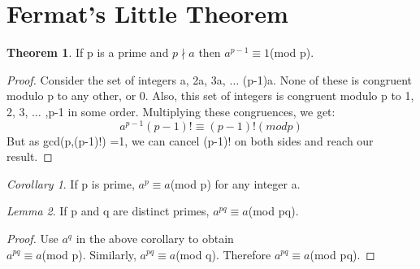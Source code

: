 \documentclass[15,a4paper]{report}
\theoremstyle{definition}
\newtheorem{theorem}{Theorem}[section]
\theoremstyle{remark}
\newtheorem{corollary}{Corollary}[theorem]
\newtheorem{lemma}[theorem]{Lemma}
\begin{document}
    \section{Fermat's Little Theorem}
        \begin{theorem}
            If p is a prime and $ p \nmid a $ then $a^{p-1} \equiv 1 $(mod p).
        \end{theorem}
            \begin{proof}
                Consider the set of integers a, 2a, 3a, $\dots$ (p-1)a. None of these is congruent modulo p to any other, or 0. Also, this set of integers is congruent modulo p to 1, 2, 3, $\dots$ ,p-1 in some order. Multiplying these congruences, we get: 
                \[ a^{p-1} (p-1)! \equiv (p-1)! (mod p)\]
                But as gcd(p,(p-1)!) =1, we can cancel (p-1)! on both sides and reach our result.
            \end{proof}
            \begin{corollary}
                If p is prime, $a^p \equiv a$(mod p) for any integer a. 
            \end{corollary}
            \begin{lemma}
                If p and q are distinct primes, $a^{pq} \equiv a $(mod pq).
            \end{lemma}
                \begin{proof}
                    Use $a^q$ in the above corollary to obtain\\ $a^{pq} \equiv a$(mod p). Similarly, $a^{pq} \equiv a$(mod q). Therefore $a^{pq} \equiv a$(mod pq).
                \end{proof}
\end{document}
